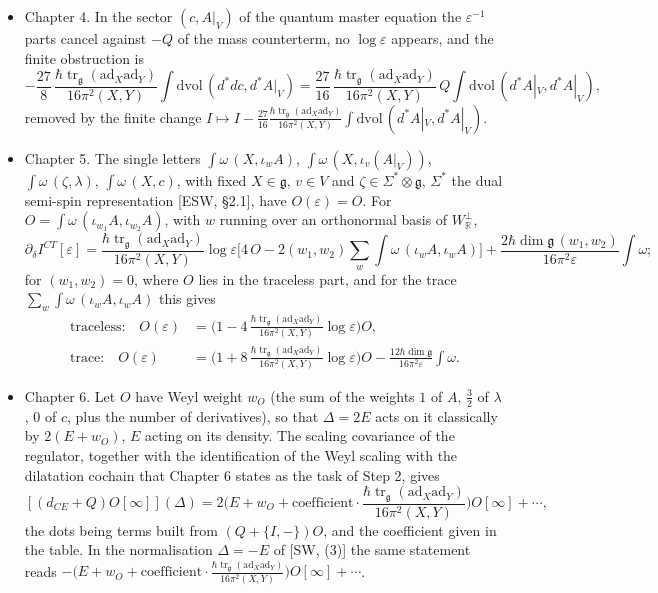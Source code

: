 \begin{itemize}
\item Chapter 4. In the sector $(c,A|_V)$ of the quantum master equation the $\varepsilon^{-1}$ parts cancel against $-Q$ of the mass counterterm, no $\log\varepsilon$ appears, and the finite obstruction is
\[
-\frac{27}{8}\,\frac{\hbar\operatorname{tr}_{\mathfrak g}(\mathrm{ad}_X\mathrm{ad}_Y)}{16\pi^2(X,Y)}\int\mathrm{dvol}\,(d^*dc,d^*A|_V)=\frac{27}{16}\,\frac{\hbar\operatorname{tr}_{\mathfrak g}(\mathrm{ad}_X\mathrm{ad}_Y)}{16\pi^2(X,Y)}\,Q\!\int\mathrm{dvol}\,(d^*A|_V,d^*A|_V),
\]
removed by the finite change $I\mapsto I-\frac{27}{16}\frac{\hbar\operatorname{tr}_{\mathfrak g}(\mathrm{ad}_X\mathrm{ad}_Y)}{16\pi^2(X,Y)}\int\mathrm{dvol}\,(d^*A|_V,d^*A|_V)$.
\item Chapter 5. The single letters $\int\omega\,(X,\iota_wA)$, $\int\omega\,(X,\iota_v(A|_V))$, $\int\omega\,(\zeta,\lambda)$, $\int\omega\,(X,c)$, with fixed $X\in\mathfrak g$, $v\in V$ and $\zeta\in\Sigma^*\otimes\mathfrak g$, $\Sigma^*$ the dual semi-spin representation [ESW, §2.1], have $O(\varepsilon)=O$. For $O=\int\omega\,(\iota_{w_1}A,\iota_{w_2}A)$, with $w$ running over an orthonormal basis of $W_{\mathbb R}^\perp$,
\[
\partial_\delta I^{CT}[\varepsilon]=\frac{\hbar\operatorname{tr}_{\mathfrak g}(\mathrm{ad}_X\mathrm{ad}_Y)}{16\pi^2(X,Y)}\log\varepsilon\Big[4\,O-2(w_1,w_2)\sum_w\int\omega\,(\iota_wA,\iota_wA)\Big]+\frac{2\hbar\dim\mathfrak g\,(w_1,w_2)}{16\pi^2\varepsilon}\int\omega ;
\]
for $(w_1,w_2)=0$, where $O$ lies in the traceless part, and for the trace $\sum_w\int\omega\,(\iota_wA,\iota_wA)$ this gives
\[
\begin{aligned}
\text{traceless:}\quad O(\varepsilon)&=\Big(1-4\,\frac{\hbar\operatorname{tr}_{\mathfrak g}(\mathrm{ad}_X\mathrm{ad}_Y)}{16\pi^2(X,Y)}\log\varepsilon\Big)O,\\
\text{trace:}\quad O(\varepsilon)&=\Big(1+8\,\frac{\hbar\operatorname{tr}_{\mathfrak g}(\mathrm{ad}_X\mathrm{ad}_Y)}{16\pi^2(X,Y)}\log\varepsilon\Big)O-\frac{12\hbar\dim\mathfrak g}{16\pi^2\varepsilon}\int\omega .
\end{aligned}
\]
\item Chapter 6. Let $O$ have Weyl weight $w_O$ (the sum of the weights $1$ of $A$, $\tfrac32$ of $\lambda$, $0$ of $c$, plus the number of derivatives), so that $\Delta=2E$ acts on it classically by $2(E+w_O)$, $E$ acting on its density. The scaling covariance of the regulator, together with the identification of the Weyl scaling with the dilatation cochain that Chapter 6 states as the task of Step 2, gives
\[
[(d_{CE}+Q)O[\infty]](\Delta)=2\Big(E+w_O+\text{coefficient}\cdot\frac{\hbar\operatorname{tr}_{\mathfrak g}(\mathrm{ad}_X\mathrm{ad}_Y)}{16\pi^2(X,Y)}\Big)O[\infty]+\cdots,
\]
the dots being terms built from $(Q+\{I,-\})O$, and the coefficient given in the table. In the normalisation $\Delta=-E$ of [SW, (3)] the same statement reads $-\Big(E+w_O+\text{coefficient}\cdot\frac{\hbar\operatorname{tr}_{\mathfrak g}(\mathrm{ad}_X\mathrm{ad}_Y)}{16\pi^2(X,Y)}\Big)O[\infty]+\cdots$.
\end{itemize}


